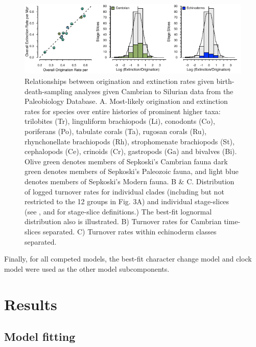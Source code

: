 \documentclass{article}
\begin{document}
\begin{figure}
  \includegraphics[width=\textwidth]{figures/Turnover PaleoStyle.pdf}

  \caption{Relationships between origination and extinction rates given birth-death-sampling analyses given Cambrian to Silurian data from the Paleobiology Database.  A. Most-likely origination and extinction rates for species over entire histories of prominent higher taxa: trilobites (Tr), linguliform brachiopods (Li), conodonts (Co), poriferans (Po), tabulate corals (Ta), rugosan corals (Ru), rhynchonellate brachiopods (Rh), strophomenate brachiopods (St), cephalopods (Ce), crinoids (Cr), gastropods (Ga) and bivalves (Bi). Olive green denotes members of Sepkoski's Cambrian fauna \citep{Sepkoski1981} dark green denotes members of Sepkoski's Paleozoic fauna, and light blue denotes members of Sepkoski's Modern fauna. B \& C. Distribution of logged turnover rates for individual clades (including but not restricted to the 12 groups in Fig. 3A) and individual stage-slices (see \cite{Bergstrom2009}, \cite{Cramer2011} and \cite{Rasmussen2019} for stage-slice definitions.)  The best-fit lognormal distribution also is illustrated.  B) Turnover rates for Cambrian time-slices separated.  C) Turnover rates within echinoderm classes separated. }
\end{figure}

Finally, for all competed models, the best-fit character change model and clock model were used as the other model subcomponents.

\section{Results}

\subsection{Model fitting}
\end{document}
